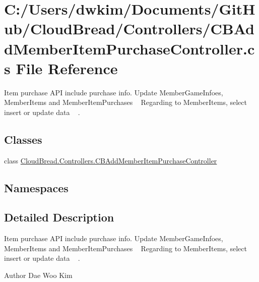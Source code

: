 \hypertarget{a00119}{}\section{C\+:/\+Users/dwkim/\+Documents/\+Git\+Hub/\+Cloud\+Bread/\+Controllers/\+C\+B\+Add\+Member\+Item\+Purchase\+Controller.cs File Reference}
\label{a00119}


Item purchase A\+PI include purchase info. Update Member\+Game\+Infoes, Member\+Items and Member\+Item\+Purchases ~\newline
Regarding to Member\+Items, select insert or update data ~\newline
.  


\subsection*{Classes}
\begin{DoxyCompactItemize}
\item 
class \hyperlink{a00006}{Cloud\+Bread.\+Controllers.\+C\+B\+Add\+Member\+Item\+Purchase\+Controller}
\end{DoxyCompactItemize}
\subsection*{Namespaces}
\begin{DoxyCompactItemize}
\end{DoxyCompactItemize}


\subsection{Detailed Description}
Item purchase A\+PI include purchase info. Update Member\+Game\+Infoes, Member\+Items and Member\+Item\+Purchases ~\newline
Regarding to Member\+Items, select insert or update data ~\newline
. 

\begin{DoxyAuthor}{Author}
Dae Woo Kim 
\end{DoxyAuthor}

